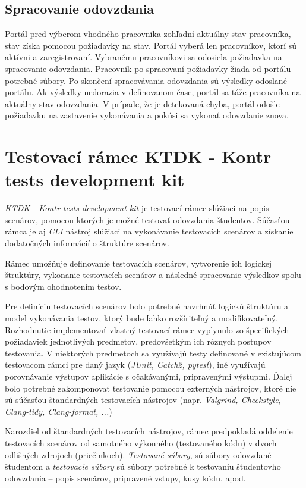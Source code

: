 \documentclass[
  digital, %
  twoside, %
  table,   %
  lof,     %
  lot,     %
]{fithesis3}
\begin{document}
\subsection{Spracovanie odovzdania}
Portál pred výberom vhodného pracovníka zohľadní aktuálny stav pracovníka, stav získa pomocou požiadavky na stav. Portál vyberá len pracovníkov, ktorí sú aktívni a zaregistrovaní. Vybranému pracovníkovi sa odosiela požiadavka na spracovanie odovzdania. Pracovník po spracovaní požiadavky žiada od portálu potrebné súbory. Po skončení spracovávania odovzdania sú výsledky odoslané portálu. Ak výsledky nedorazia v definovanom čase, portál sa táže pracovníka na aktuálny stav odovzdania. V prípade, že je detekovaná chyba, portál odošle požiadavku na zastavenie vykonávania a pokúsi sa vykonať odovzdanie znova. 



\section{Testovací rámec KTDK - Kontr tests development kit}
\emph{KTDK - Kontr tests development kit} je testovací rámec slúžiaci na popis scenárov, pomocou ktorých je možné testovať odovzdania študentov. Súčasťou rámca je aj \emph{CLI} nástroj slúžiaci na vykonávanie testovacích scenárov a získanie dodatočných informácií o štruktúre scenárov.

Rámec umožňuje definovanie testovacích scenárov, vytvorenie ich logickej štruktúry, vykonanie testovacích scenárov a následné spracovanie výsledkov spolu s bodovým ohodnotením testov.

Pre definíciu testovacích scenárov bolo potrebné navrhnúť logickú štruktúru a model vykonávania testov, ktorý bude ľahko rozšíriteľný a modifikovateľný. Rozhodnutie implementovať vlastný testovací rámec vyplynulo zo špecifických požiadaviek jednotlivých predmetov, predovšetkým ich rôznych postupov testovania. V niektorých predmetoch sa využívajú testy definované v existujúcom testovacom rámci pre daný jazyk (\emph{JUnit, Catch2, pytest}), iné využívajú porovnávanie výstupov aplikácie s očakávanými, pripravenými výstupmi. Ďalej bolo potrebné zakomponovať testovanie pomocou externých nástrojov, ktoré nie sú súčasťou štandardných testovacích nástrojov (napr. \emph{Valgrind, Checkstyle, Clang-tidy, Clang-format, ...})

Narozdiel od štandardných testovacích nástrojov, rámec predpokladá oddelenie testovacích scenárov od samotného výkonného (testovaného kódu) v dvoch odlišných zdrojoch (priečinkoch). \emph{Testované súbory}, sú súbory odovzdané študentom a \emph{testovacie súbory} sú súbory potrebné k testovaniu študentovho odovzdania -- popis scenárov, pripravené vstupy, kusy kódu, apod.
\end{document}
